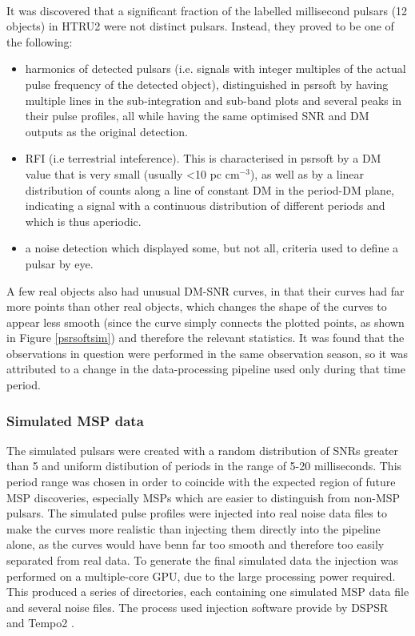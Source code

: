 \documentclass[12pt]{article}
\begin{document}
\paragraph{}
It was discovered that a significant fraction of the labelled millisecond pulsars (12 objects) in HTRU2 were not distinct pulsars. Instead, they proved to be one of the following:
\begin{itemize}
\item harmonics of detected pulsars (i.e. signals with integer multiples of the actual pulse frequency of the detected object), distinguished in psrsoft by having multiple lines in the sub-integration and sub-band plots and several peaks in their pulse profiles, all while having the same optimised SNR and DM outputs as the original detection.
\item RFI (i.e terrestrial inteference). This is characterised in psrsoft by a DM value that is  very small (usually \textless 10 pc cm$^{-3}$), as well as by a linear distribution of counts along a line of constant DM in the period-DM plane, indicating a signal with a continuous distribution of different periods and which is thus aperiodic.
\item a noise detection which displayed some, but not all, criteria used to define a pulsar by eye.
\end{itemize}

A few real objects also had unusual DM-SNR curves, in that their curves had far more points than other real objects, which changes the shape of the curves to appear less smooth (since the curve simply connects the plotted points, as shown in Figure \ref{psrsoftsim}) and therefore the relevant statistics. It was found that the observations in question were performed in the same observation season, so it was attributed to a change in the data-processing pipeline used only during that time period.

\subsubsection{Simulated MSP data}
The simulated pulsars were created with a random distribution of SNRs greater than 5 and uniform distibution of periods in the range of 5-20 milliseconds. This period range was chosen in order to coincide with the expected region of future MSP discoveries, especially MSPs which are easier to distinguish from non-MSP pulsars. The simulated pulse profiles were injected into real noise data files to make the curves more realistic than injecting them directly into the pipeline alone, as the curves would have benn far too smooth and therefore too easily separated from real data. To generate the final simulated data the injection was performed on a multiple-core GPU, due to the large processing power required. This produced a series of directories, each containing one simulated MSP data file and several noise files. The process used injection software provide by DSPSR \cite{van2011dspsr} and Tempo2 \cite{hobbs2006tempo2}.
\end{document}
